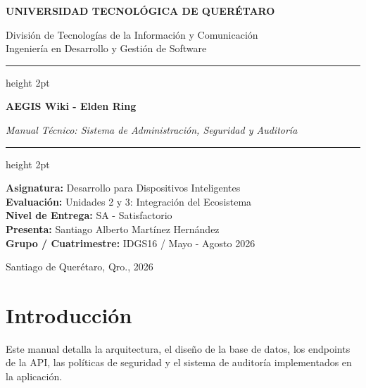 \documentclass[11pt,a4paper]{article}
\begin{document}
\begin{titlepage}
    \centering
    \vspace*{0.5cm}
    {\fontsize{18}{22}\selectfont \textbf{UNIVERSIDAD TECNOLÓGICA DE QUERÉTARO} \par}
    \vspace{0.6cm}
    {\fontsize{14}{17}\selectfont División de Tecnologías de la Información y Comunicación \\ 
    Ingeniería en Desarrollo y Gestión de Software \par}
    \vspace{1.5cm}
    
    {\color{brown}\hrule height 2pt}
    \vspace{0.6cm}
    {\fontsize{20}{24}\selectfont \textbf{AEGIS Wiki - Elden Ring} \par}
    \vspace{0.4cm}
    {\fontsize{16}{20}\selectfont \textit{Manual Técnico: Sistema de Administración, Seguridad y Auditoría} \par}
    \vspace{0.6cm}
    {\color{brown}\hrule height 2pt}
    
    \vspace{1.5cm}
    {\fontsize{12}{15}\selectfont
    \textbf{Asignatura:} Desarrollo para Dispositivos Inteligentes \\
    \vspace{0.2cm}
    \textbf{Evaluación:} Unidades 2 y 3: Integración del Ecosistema \\
    \vspace{0.2cm}
    \textbf{Nivel de Entrega:} SA - Satisfactorio \\
    \vspace{0.2cm}
    \textbf{Presenta:} Santiago Alberto Martínez Hernández \\
    \vspace{0.2cm}
    \textbf{Grupo / Cuatrimestre:} IDGS16 / Mayo - Agosto 2026 \par}
    
    \vfill
    {\large Santiago de Querétaro, Qro., 2026 \par}
\end{titlepage}

\newpage

\section{Introducción}
Este manual detalla la arquitectura, el diseño de la base de datos, los endpoints de la API, las políticas de seguridad y el sistema de auditoría implementados en la aplicación.
\end{document}
